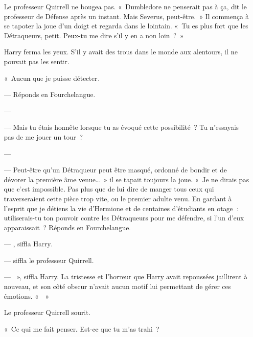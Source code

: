Le professeur Quirrell ne bougea pas. «~Dumbledore ne penserait pas à ça, dit le professeur de Défense après un instant. Mais Severus, peut-être.~» Il commença à se tapoter la joue d'un doigt et regarda dans le lointain. «~Tu es plus fort que les Détraqueurs, petit. Peux-tu me dire s'il y en a non loin~?~»

Harry ferma les yeux. S'il y avait des trous dans le monde aux alentours, il ne pouvait pas les sentir.

«~Aucun que je puisse détecter.

--- Réponds en Fourchelangue.

--- 

--- Mais tu étais honnête lorsque tu as évoqué cette possibilité~? Tu n'essayais pas de me jouer un tour~?

--- 

--- Peut-être qu'un Détraqueur peut être masqué, ordonné de bondir et de dévorer la première âme venue…~» il se tapait toujours la joue. «~Je ne dirais pas que c'est impossible. Pas plus que de lui dire de manger tous ceux qui traverseraient cette pièce trop vite, ou le premier adulte venu. En gardant à l'esprit que je détiens la vie d'Hermione et de centaines d'étudiants en otage~: utiliserais-tu ton pouvoir contre les Détraqueurs pour me défendre, si l'un d'eux apparaissait~? Réponds en Fourchelangue.

--- , siffla Harry.

---  siffla le professeur Quirrell. 

--- ~», siffla Harry. La tristesse et l'horreur que Harry avait repoussées jaillirent à nouveau, et son côté obscur n'avait aucun motif lui permettant de gérer ces émotions. «~~»

Le professeur Quirrell sourit.

«~Ce qui me fait penser. Est-ce que tu m'as trahi~?

